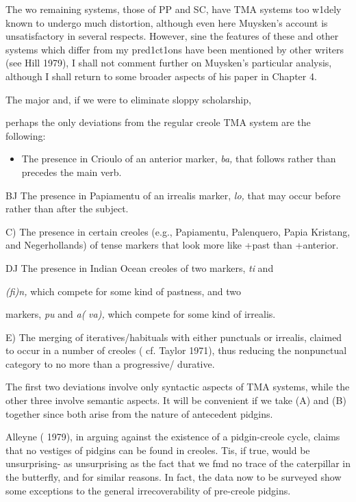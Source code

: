 The wo remaining systems, those of PP and SC, have TMA sys\-tems too w1dely known to undergo much distortion, although even here Muysken's account is unsatisfactory in several respects. However, sine the features of these and other systems which differ from my pred1ct1ons have been mentioned by other writers (see Hill 1979), I shall not comment further on Muysken's particular analysis, although I shall return to some broader aspects of his paper in Chapter 4.

The major and, if we were to eliminate sloppy scholarship,

perhaps the only deviations from the regular creole TMA system are the following:

\begin{itemize}
\item The presence in Crioulo of an anterior marker, \textit{ba,} that follows rather than precedes the main verb.
\end{itemize}

BJ The presence in Papiamentu of an irrealis marker, \textit{lo,} that may occur before rather than after the subject.

C) The presence in certain creoles (e.g., Papiamentu, Palenquero, Papia Kristang, and Negerhollands) of tense markers that look more like +past than +anterior.

DJ The presence in Indian Ocean creoles of two markers, \textit{ti} and

\textit{(}\textit{fi)n,} which compete for some kind of pastness, and two

markers, \textit{pu }and \textit{a(} \textit{va),} which compete for some kind of irrealis.


E) The merging of iteratives/habituals with either punctuals or irrealis, claimed to occur in a number of creoles ( cf. Taylor 1971), thus reducing the nonpunctual category to no more than a progressive/ durative.

The first two deviations involve only syntactic aspects of TMA systems, while the other three involve semantic aspects. It will be convenient if we take (A) and (B) together since both arise from the nature of antecedent pidgins.

Alleyne ( 1979), in arguing against the existence of a pidgin-creole cycle, claims that no vestiges of pidgins can be found in creoles. Tis, if true, would be unsurprising- as unsurprising as the fact that we fmd no trace of the caterpillar in the butterfly, and for similar reasons. In fact, the data now to be surveyed show some exceptions to the general irrecoverability of pre-creole pidgins.

